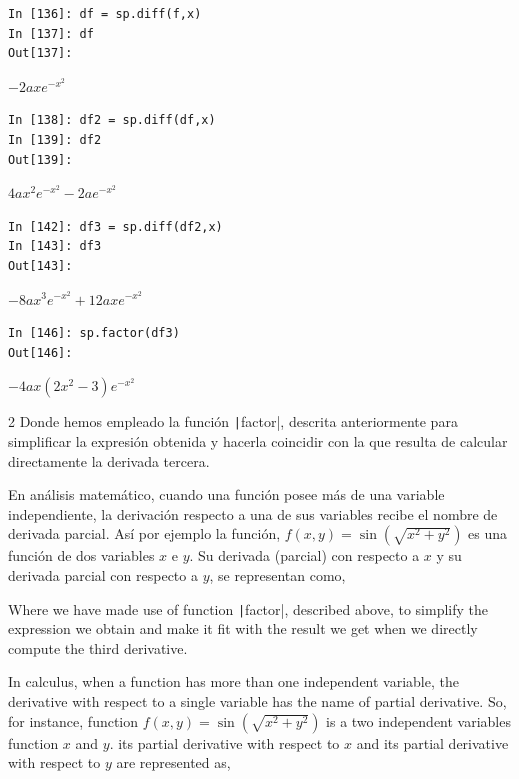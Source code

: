 \begin{center}
	\begin{minipage}{.5\textwidth}
		\begin{verbatim}
In [136]: df = sp.diff(f,x)
In [137]: df
Out[137]: 			
		\end{verbatim}
		$-2axe^{-x^2}$
		\begin{verbatim}
In [138]: df2 = sp.diff(df,x)
In [139]: df2
Out[139]: 
		\end{verbatim}
		$4ax^2e^{-x^2}-2ae^{-x^2}$
		\begin{verbatim}
In [142]: df3 = sp.diff(df2,x)
In [143]: df3
Out[143]:  
		\end{verbatim}
		$-8ax^3e^{-x^2} + 12axe^{-x^2}$
		\begin{verbatim}
In [146]: sp.factor(df3)
Out[146]:   
\end{verbatim}
$-4ax(2x^2-3)e^{-x^2}$
	\end{minipage}
\end{center}
\begin{paracol}{2}
\noindent Donde hemos empleado la función \texttt|factor|, descrita anteriormente para simplificar la expresión obtenida y hacerla coincidir con la que resulta de calcular directamente la derivada tercera.

En análisis matemático, cuando una función posee más de una variable independiente, la derivación respecto a una de sus variables recibe el nombre de derivada parcial. Así por ejemplo la función,
$f(x,y) =\sin \left( \sqrt{x^2+y^2} \right)$ es una función de dos variables $x$ e $y$. Su derivada (parcial) con respecto a $x$ y su derivada parcial con respecto a $y$, se representan como,

\switchcolumn
\noindent Where we have made use of function \texttt|factor|, described above, to simplify the expression we obtain and make it fit with the result we get when we directly compute the third derivative.

In calculus, when a function has more than one independent variable, the derivative with respect to a single variable has the name of partial derivative. So, for instance, function  $f(x,y) =\sin \left( \sqrt{x^2+y^2} \right)$  is a two independent variables function $x$ and $y$. its partial derivative with respect to $x$ and its partial derivative with respect to $y$ are represented as,
\end{paracol}

